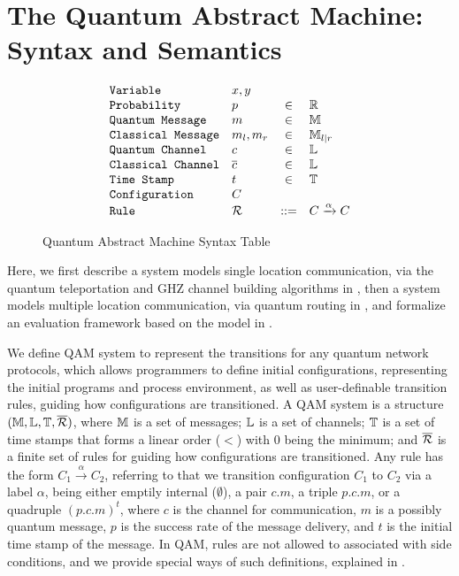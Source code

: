 \section{The Quantum Abstract Machine:  Syntax and Semantics} \label{sec:qam}

\begin{figure}[t]
{\small
  \[\begin{array}{llcl} 
      \texttt{Variable} & x,y \\
      \texttt{Probability} & p &\in &\Rs\\
      \texttt{Quantum Message} & m &\in& \mathbb{M}\\
      \texttt{Classical Message} & m_l,m_r &\in& \mathbb{M}_{l\mid r}\\
    \texttt{Quantum Channel} & c &\in& \Ls\\
    \texttt{Classical Channel} & \overline{c} &\in& \Ls\\
    \texttt{Time Stamp} & t &\in& \mathbb{T}\\
\ignore{
    \texttt{Timed Label} & \alpha^t &::=& \qsend{p}{c}{m}^{t}\\
    \texttt{Label} & \iota &::=& c.m \mid p.c.m \mid \alpha^t \mid \emptyset\\
}
      \texttt{Configuration} & C & \\
      \texttt{Rule} & \rules & ::= & C \xrightarrow{\alpha} C 
    \end{array}
  \]
}
\caption{Quantum Abstract Machine Syntax Table}
  \label{fig:q-pi-syntax}
\end{figure}

Here, we first describe a system models single location communication, via the quantum teleportation and GHZ channel building algorithms in , then a system models multiple location communication, via quantum routing in ,
and formalize an evaluation framework based on the model in .

We define QAM system to represent the transitions for any quantum network protocols, which allows programmers to define initial configurations, representing the initial programs and process environment, as well as user-definable transition rules, guiding how configurations are transitioned. A QAM system is a structure $(\Ms,\Ls,\Ts,\overline{\rules})$,
where $\Ms$ is a set of messages;
$\Ls$ is a set of channels;
$\Ts$ is a set of time stamps that forms a linear order ($<$) with $0$ being the minimum;
and $\overline{\rules}$ is a finite set of rules for guiding how configurations are transitioned. 
Any rule has the form $C_1 \xrightarrow{\alpha} C_2$, referring to that we transition configuration $C_1$ to $C_2$ via a label $\alpha$, being either emptily internal ($\emptyset$), a pair $c.m$, a triple $p.c.m$, or a quadruple $(p.c.m)^t$, where $c$ is the channel for communication, $m$ is a possibly quantum message, $p$ is the success rate of the message delivery, and $t$ is the initial time stamp of the message. In QAM, rules are not allowed to associated with side conditions, and we provide special ways of such definitions, explained in .

